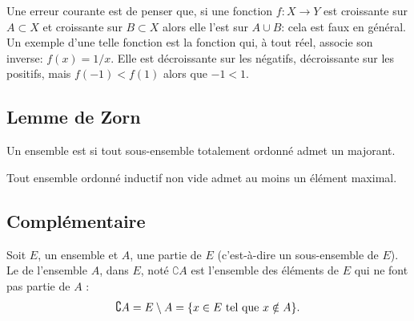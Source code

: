 \begin{remark}
  Une erreur courante est de penser que, si une fonction \( f: X \to Y \) est croissante sur \( A \subset X \) et croissante sur \( B \subset X \) alors elle l'est sur \( A \cup B \): cela est faux en général. Un exemple d'une telle fonction est la fonction qui, à tout réel, associe son inverse: \( f(x) = 1/x \). Elle est décroissante sur les négatifs, décroissante sur les positifs, mais \( f(-1) < f(1) \) alors que \( -1 < 1 \).
\end{remark}


\subsection{Lemme de Zorn}

\begin{definition}  \label{DefGHDfyyz}
    Un ensemble est  si tout sous-ensemble totalement ordonné admet un majorant.
\end{definition}


\begin{lemma}    \label{LemUEGjJBc}
    Tout ensemble ordonné inductif non vide admet au moins un élément maximal.
\end{lemma}

\subsection{Complémentaire}
\label{AppComplement}

\begin{definition}
    Soit $E$, un ensemble et $A$, une partie de $E$ (c'est-à-dire un sous-ensemble de $E$). Le  de l'ensemble $A$, dans $E$, noté $\complement A$ est l'ensemble des éléments de $E$ qui ne font pas partie de $A$ :
    \begin{equation}
	    \complement A=E\setminus A=\{ x\in E\text{ tel que } x\notin A \}.
    \end{equation}
\end{definition}

